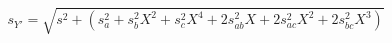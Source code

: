 

\[
s_{Y'} = \sqrt{s^{2} + (s_{a}^{2} + s_{b}^{2}X^{2} + s_{c}^{2}X^{4} + 2s_{ab}^{2}X + 2s_{ac}^{2}X^{2} + 2s_{bc}^{2}X^{3} ) }

\]


